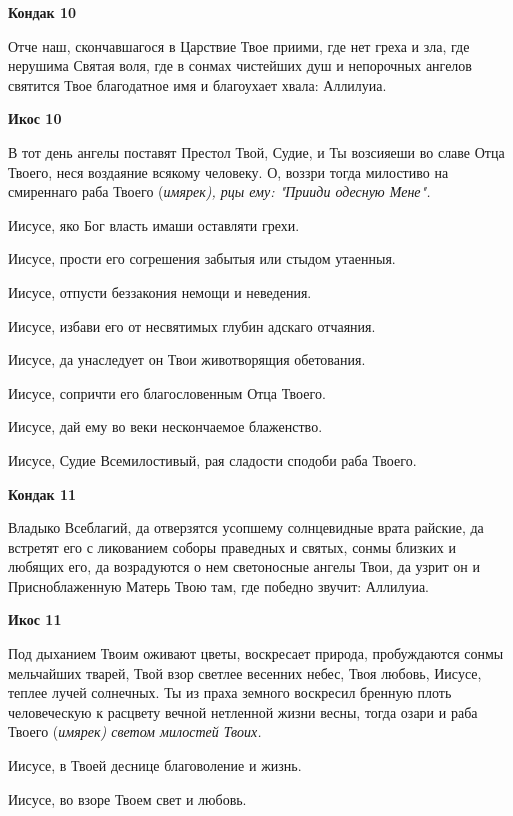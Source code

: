 \medskip


\bfseries Кондак 10\normalfont{}


Отче наш, скончавшагося в Царствие Твое приими, где нет греха и зла, где нерушима Святая воля, где в сонмах чистейших душ и непорочных ангелов святится Твое благодатное имя и благоухает хвала: Аллилуиа.


\medskip


\bfseries Икос 10\normalfont{}


В тот день ангелы поставят Престол Твой, Судие, и Ты возсияеши во славе Отца Твоего, неся воздаяние всякому человеку. О, воззри тогда милостиво на смиреннаго раба Твоего (\itshape имярек\normalfont{}), рцы ему: "Прииди одесную Мене". 

Иисусе, яко Бог власть имаши оставляти грехи. 

Иисусе, прости его согрешения забытыя или стыдом утаенныя. 

Иисусе, отпусти беззакония немощи и неведения. 

Иисусе, избави его от несвятимых глубин адскаго отчаяния. 

Иисусе, да унаследует он Твои животворящия обетования. 

Иисусе, сопричти его благословенным Отца Твоего. 

Иисусе, дай ему во веки нескончаемое блаженство. 

Иисусе, Судие Всемилостивый, рая сладости сподоби раба Твоего.


\medskip


\bfseries Кондак 11\normalfont{}


Владыко Всеблагий, да отверзятся усопшему солнцевидные врата райские, да встретят его с ликованием соборы праведных и святых, сонмы близких и любящих его, да возрадуются о нем светоносные ангелы Твои, да узрит он и Присноблаженную Матерь Твою там, где победно звучит: Аллилуиа.


\medskip


\bfseries Икос 11\normalfont{}


Под дыханием Твоим оживают цветы, воскресает природа, пробуждаются сонмы мельчайших тварей, Твой взор светлее весенних небес, Твоя любовь, Иисусе, теплее лучей солнечных. Ты из праха земного воскресил бренную плоть человеческую к расцвету вечной нетленной жизни весны, тогда озари и раба Твоего (\itshape имярек\normalfont{}) светом милостей Твоих. 

Иисусе, в Твоей деснице благоволение и жизнь. 

Иисусе, во взоре Твоем свет и любовь. 

